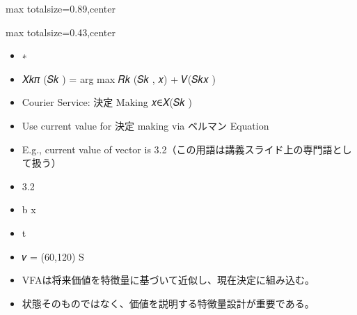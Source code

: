 \begin{minipage}[t]{0.58\textwidth}
\begin{adjustbox}{max totalsize={\textwidth}{0.89\textheight},center}
\begin{minipage}{\textwidth}
\end{minipage}
\end{adjustbox}
\end{minipage}


\clearpage
{}
\begin{minipage}[t]{0.405\textwidth}
\begin{adjustbox}{max totalsize={\textwidth}{0.43\textheight},center}
\begin{minipage}{\textwidth}\scriptsize
{}\begin{itemize}
\item ∗
\item 𝑋𝑘𝜋 (𝑆𝑘 ) = arg max 𝑅𝑘 (𝑆𝑘 , 𝑥) + 𝑉(𝑆𝑘𝑥 )
\item Courier Service: 決定 Making 𝑥∈𝑋(𝑆𝑘 )
\item Use current value for 決定 making via ベルマン Equation
\item E.g., current value of vector is 3.2（この用語は講義スライド上の専門語として扱う）
\item 3.2
\item b x
\item t
\item 𝑣 = (60,120) S ෠
\end{itemize}\begin{itemize}
\item VFAは将来価値を特徴量に基づいて近似し、現在決定に組み込む。
\item 状態そのものではなく、価値を説明する特徴量設計が重要である。
\end{itemize}
\end{minipage}
\end{adjustbox}
\end{minipage}\hfill
